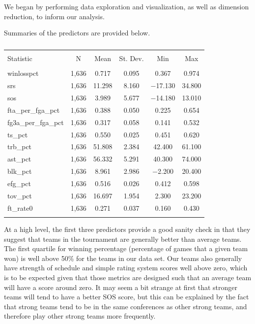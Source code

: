 \documentclass[10pt,a4paper, hidelinks]{article} %
\begin{document}
We began by performing data exploration and visualization, as well as dimension reduction, to inform our analysis.

Summaries of the predictors are provided below.



\begin{table}[!htbp] \centering 
	\caption{} 
	\label{} 
	\begin{tabular}{@{\extracolsep{5pt}}lccccc} 
		\\[-1.8ex]\hline 
		\hline \\[-1.8ex] 
		Statistic & \multicolumn{1}{c}{N} & \multicolumn{1}{c}{Mean} & \multicolumn{1}{c}{St. Dev.} & \multicolumn{1}{c}{Min} & \multicolumn{1}{c}{Max} \\ 
		\hline \\[-1.8ex] 
		winlosspct & 1,636 & 0.717 & 0.095 & 0.367 & 0.974 \\ 
		srs & 1,636 & 11.298 & 8.160 & $-$17.130 & 34.800 \\ 
		sos & 1,636 & 3.989 & 5.677 & $-$14.180 & 13.010 \\ 
		fta\_per\_fga\_pct & 1,636 & 0.388 & 0.050 & 0.225 & 0.654 \\ 
		fg3a\_per\_fga\_pct & 1,636 & 0.317 & 0.058 & 0.141 & 0.532 \\ 
		ts\_pct & 1,636 & 0.550 & 0.025 & 0.451 & 0.620 \\ 
		trb\_pct & 1,636 & 51.808 & 2.384 & 42.400 & 61.100 \\ 
		ast\_pct & 1,636 & 56.332 & 5.291 & 40.300 & 74.000 \\ 
		blk\_pct & 1,636 & 8.961 & 2.986 & $-$2.200 & 20.400 \\ 
		efg\_pct & 1,636 & 0.516 & 0.026 & 0.412 & 0.598 \\ 
		tov\_pct & 1,636 & 16.697 & 1.954 & 2.300 & 23.200 \\ 
		ft\_rate0 & 1,636 & 0.271 & 0.037 & 0.160 & 0.430 \\ 
		\hline \\[-1.8ex] 
	\end{tabular} 
\end{table} 

At a high level, the first three predictors provide a good sanity check in that they suggest that  teams in the tournament are generally better than average teams. The first quartile for winning percentage (percentage of games that a given team won) is well above 50\% for the teams in our data set. Our teams also generally have strength of schedule and simple rating system scores well above zero, which is to be expected given that those metrics are designed such that an average team will have a score around zero. It may seem a bit strange at first that stronger teams will tend to have a better SOS score, but this can be explained by the fact that strong teams tend to be in the same conferences as other strong teams, and therefore play other strong teams more frequently.
\end{document}
